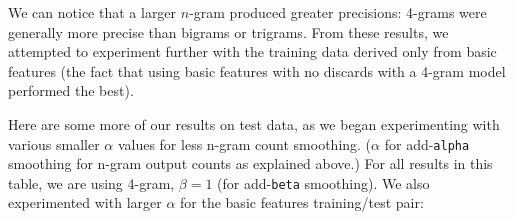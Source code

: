 \documentclass{article}
\begin{document}
We can notice that a larger $n$-gram produced greater precisions: 4-grams were generally more precise than bigrams or trigrams. From these results, we attempted to experiment further with the training data derived only from basic features (the fact that using basic features with no discards with a 4-gram model performed the best).\par\bigskip

Here are some more of our results on test data, as we began experimenting with various smaller $\alpha$ values for less n-gram count smoothing. ($\alpha$ for add-\texttt{alpha} smoothing for n-gram output counts as explained above.) For all results in this table, we are using 4-gram, $\beta = 1$ (for add-\texttt{beta} smoothing). We also experimented with larger $\alpha$ for the basic features training/test pair:\par\bigskip
\end{document}
